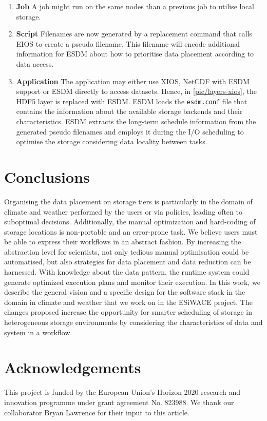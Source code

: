 \documentclass{superfri}
\newcommand{\bnl}[1]{\textcolor{green}{BNL: #1}}
\begin{document}
\begin{enumerate}
  \item \textbf{Job}
  A job might run on the same nodes than a previous job to utilise local storage.

  \item \textbf{Script}
  Filenames are now generated by a replacement command that calls EIOS to create a pseudo filename.
  This filename will encode additional information for ESDM about how to prioritise data placement according to data access.

  \item \textbf{Application}
  The application may either use XIOS, NetCDF with ESDM support or ESDM directly to access datasets.
  Hence, in \cref{pic/layers-xios}, the HDF5 layer is replaced with ESDM.
  ESDM loads the \texttt{esdm.conf} file that contains the information about the available storage backends and their characteristics.
  ESDM extracts the long-term schedule information from the generated pseudo filenames and employs it during the I/O scheduling to optimise the storage considering data locality between tasks.

\end{enumerate}

\section{Conclusions}
\label{sec:conclusions}

Organising the data placement on storage tiers is particularly in the domain of climate and weather performed by the users or via policies, leading often to suboptimal decisions.
Additionally, the manual optimization and hard-coding of storage locations is non-portable and an error-prone task.
We believe users must be able to express their workflows in an abstract fashion.
By increasing the abstraction level for scientists, not only tedious manual optimisation could be automatised, but also strategies for data placement and data reduction can be harnessed.
With knowledge about the data pattern, the runtime system could generate optimized execution plans and monitor their execution.
In this work, we describe the general vision and a specific design for the software stack in the domain in climate and weather that we work on in the ESiWACE project.
The changes proposed increase the opportunity for smarter scheduling of storage in heterogeneous storage environments by considering the characteristics of data and system in a workflow.

\section*{Acknowledgements}

\small
This project is funded by the European Union's Horizon 2020 research and innovation programme under grant agreement No. 823988.
We thank our collaborator Bryan Lawrence for their input to this article.

\openaccess


\end{document}
